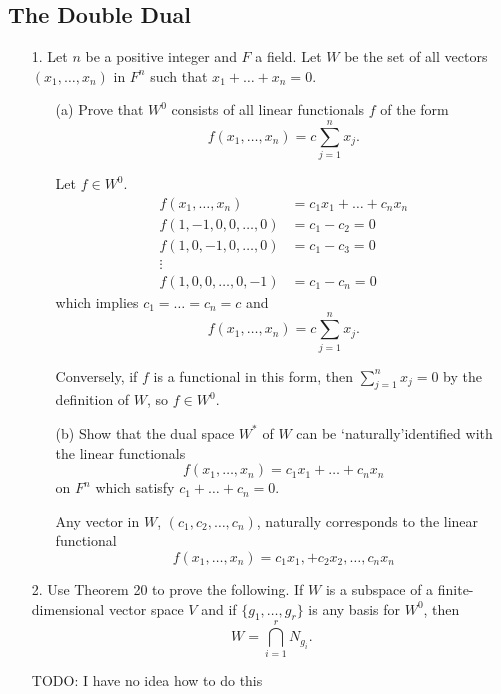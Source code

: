 \documentclass{article}
\begin{document}
\subsection{The Double Dual}
\begin{enumerate}[listparindent=\parindent]
\item[1.] Let \(n\) be a positive integer and \(F\) a field.
    Let \(W\) be the set of all vectors \((x_1, \dots, x_n)\) in \(F^n\) such that \(x_1 + \dots + x_n = 0\).
\begin{enumerate}[listparindent=\parindent]
    \item[(a)] Prove that \(W^0\) consists of all linear functionals \(f\) of the form
        \[ f(x_1, \dots, x_n) = c\sum_{j=1}^n x_j. \]

        Let \(f \in W^0\).
        \begin{align*}
            f(x_1, \dots, x_n) &= c_1x_1 + \dots + c_nx_n \\
            f(1, -1, 0, 0, \dots, 0) &= c_1 - c_2 = 0 \\
            f(1, 0, -1, 0, \dots, 0) &= c_1 - c_3 = 0 \\
            \vdots \\
            f(1, 0, 0, \dots, 0, -1) &= c_1 - c_n = 0
        \end{align*}
        which implies \(c_1 = \dots = c_n = c\) and
        \[ f(x_1, \dots, x_n) = c\sum_{j=1}^n x_j. \]

        Conversely, if \(f\) is a functional in this form, then \(\sum_{j=1}^n x_j = 0\) by the definition of \(W\), so \(f \in W^0\).

    \item[(b)] Show that the dual space \(W^*\) of \(W\) can be \lq{naturally}\rq identified with the linear functionals
        \[ f(x_1, \dots, x_n)= c_1x_1 + \dots + c_nx_n \]
        on \(F^n\) which satisfy \(c_1 + \dots + c_n = 0\).

        Any vector in \(W\), \((c_1, c_2, \dots, c_n)\), naturally corresponds to the linear functional
        \[ f(x_1, \dots, x_n) = c_1x_1, + c_2x_2, \dots, c_nx_n \]
\end{enumerate}

\item[2.] Use Theorem 20 to prove the following.
    If \(W\) is a subspace of a finite-dimensional vector space \(V\) and if \(\{g_1, \dots, g_r\}\) is any basis for \(W^0\), then
    \[ W = \bigcap_{i=1}^r N_{g_i}. \]
    
    TODO: I have no idea how to do this


\end{enumerate}
\end{document}
